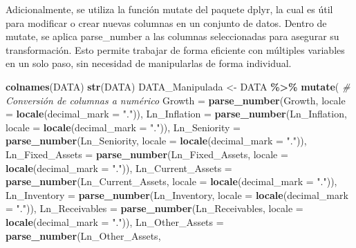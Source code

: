 \documentclass[
]{article}
\newenvironment{Shaded}{\begin{snugshade}}{\end{snugshade}}
\newcommand{\AttributeTok}[1]{\textcolor[rgb]{0.13,0.29,0.53}{#1}}
\newcommand{\CommentTok}[1]{\textcolor[rgb]{0.56,0.35,0.01}{\textit{#1}}}
\newcommand{\FunctionTok}[1]{\textcolor[rgb]{0.13,0.29,0.53}{\textbf{#1}}}
\newcommand{\NormalTok}[1]{#1}
\newcommand{\OtherTok}[1]{\textcolor[rgb]{0.56,0.35,0.01}{#1}}
\newcommand{\SpecialCharTok}[1]{\textcolor[rgb]{0.81,0.36,0.00}{\textbf{#1}}}
\newcommand{\StringTok}[1]{\textcolor[rgb]{0.31,0.60,0.02}{#1}}
\begin{document}
Adicionalmente, se utiliza la función mutate del paquete dplyr, la cual
es útil para modificar o crear nuevas columnas en un conjunto de datos.
Dentro de mutate, se aplica parse\_number a las columnas seleccionadas
para asegurar su transformación. Esto permite trabajar de forma
eficiente con múltiples variables en un solo paso, sin necesidad de
manipularlas de forma individual.

\begin{Shaded}
\begin{Highlighting}[]
\FunctionTok{colnames}\NormalTok{(DATA)}
\FunctionTok{str}\NormalTok{(DATA)}
\NormalTok{DATA\_Manipulada }\OtherTok{\textless{}{-}}\NormalTok{ DATA }\SpecialCharTok{\%\textgreater{}\%}
  \FunctionTok{mutate}\NormalTok{(}
    \CommentTok{\# Conversión de columnas a numérico}
    \AttributeTok{Growth =} \FunctionTok{parse\_number}\NormalTok{(Growth, }
                          \AttributeTok{locale =} \FunctionTok{locale}\NormalTok{(}\AttributeTok{decimal\_mark =} \StringTok{"."}\NormalTok{)),}
    \AttributeTok{Ln\_Inflation =} \FunctionTok{parse\_number}\NormalTok{(Ln\_Inflation, }
                                \AttributeTok{locale =} \FunctionTok{locale}\NormalTok{(}\AttributeTok{decimal\_mark =} \StringTok{"."}\NormalTok{)),}
    \AttributeTok{Ln\_Seniority =} \FunctionTok{parse\_number}\NormalTok{(Ln\_Seniority, }
                                \AttributeTok{locale =} \FunctionTok{locale}\NormalTok{(}\AttributeTok{decimal\_mark =} \StringTok{"."}\NormalTok{)),}
    \AttributeTok{Ln\_Fixed\_Assets =} \FunctionTok{parse\_number}\NormalTok{(Ln\_Fixed\_Assets, }
                                   \AttributeTok{locale =} \FunctionTok{locale}\NormalTok{(}\AttributeTok{decimal\_mark =} \StringTok{"."}\NormalTok{)),}
    \AttributeTok{Ln\_Current\_Assets =} \FunctionTok{parse\_number}\NormalTok{(Ln\_Current\_Assets, }
                                     \AttributeTok{locale =} \FunctionTok{locale}\NormalTok{(}\AttributeTok{decimal\_mark =} \StringTok{"."}\NormalTok{)),}
    \AttributeTok{Ln\_Inventory =} \FunctionTok{parse\_number}\NormalTok{(Ln\_Inventory, }
                                \AttributeTok{locale =} \FunctionTok{locale}\NormalTok{(}\AttributeTok{decimal\_mark =} \StringTok{"."}\NormalTok{)),}
    \AttributeTok{Ln\_Receivables =} \FunctionTok{parse\_number}\NormalTok{(Ln\_Receivables, }
                                  \AttributeTok{locale =} \FunctionTok{locale}\NormalTok{(}\AttributeTok{decimal\_mark =} \StringTok{"."}\NormalTok{)),}
    \AttributeTok{Ln\_Other\_Assets =} \FunctionTok{parse\_number}\NormalTok{(Ln\_Other\_Assets, }

\end{Highlighting}
\end{Shaded}
\end{document}
